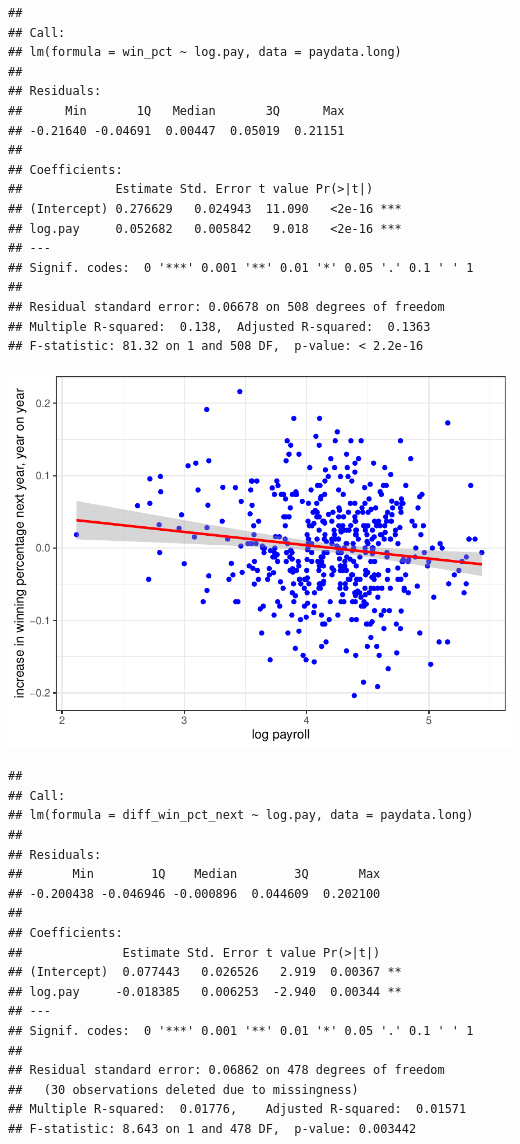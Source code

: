 \documentclass[
  12pt,
]{article}
\begin{document}
\begin{verbatim}
## 
## Call:
## lm(formula = win_pct ~ log.pay, data = paydata.long)
## 
## Residuals:
##      Min       1Q   Median       3Q      Max 
## -0.21640 -0.04691  0.00447  0.05019  0.21151 
## 
## Coefficients:
##             Estimate Std. Error t value Pr(>|t|)    
## (Intercept) 0.276629   0.024943  11.090   <2e-16 ***
## log.pay     0.052682   0.005842   9.018   <2e-16 ***
## ---
## Signif. codes:  0 '***' 0.001 '**' 0.01 '*' 0.05 '.' 0.1 ' ' 1
## 
## Residual standard error: 0.06678 on 508 degrees of freedom
## Multiple R-squared:  0.138,  Adjusted R-squared:  0.1363 
## F-statistic: 81.32 on 1 and 508 DF,  p-value: < 2.2e-16
\end{verbatim}

\includegraphics{hw1_sol_files/figure-latex/unnamed-chunk-18-2.pdf}

\begin{verbatim}
## 
## Call:
## lm(formula = diff_win_pct_next ~ log.pay, data = paydata.long)
## 
## Residuals:
##       Min        1Q    Median        3Q       Max 
## -0.200438 -0.046946 -0.000896  0.044609  0.202100 
## 
## Coefficients:
##              Estimate Std. Error t value Pr(>|t|)   
## (Intercept)  0.077443   0.026526   2.919  0.00367 **
## log.pay     -0.018385   0.006253  -2.940  0.00344 **
## ---
## Signif. codes:  0 '***' 0.001 '**' 0.01 '*' 0.05 '.' 0.1 ' ' 1
## 
## Residual standard error: 0.06862 on 478 degrees of freedom
##   (30 observations deleted due to missingness)
## Multiple R-squared:  0.01776,    Adjusted R-squared:  0.01571 
## F-statistic: 8.643 on 1 and 478 DF,  p-value: 0.003442
\end{verbatim}
\end{document}
